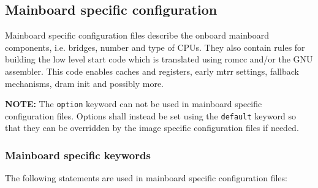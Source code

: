 \documentclass[titlepage,12pt]{article}
\begin{document}
\newpage

\subsection{Mainboard specific configuration}

Mainboard specific configuration files describe the onboard
mainboard components, i.e. bridges, number and type of CPUs. They also
contain rules for building the low level start code which is translated
using romcc and/or the GNU assembler.  This code enables caches and
registers, early mtrr settings, fallback mechanisms, dram init and
possibly more.

\textbf{NOTE:} The \texttt{option} keyword can not be used in mainboard 
specific configuration files.  Options shall instead be set using the 
\texttt{default} keyword so that they can be overridden by the image 
specific configuration files if needed.

\subsubsection{Mainboard specific keywords}

The following statements are used in mainboard specific configuration
files:
\end{document}
